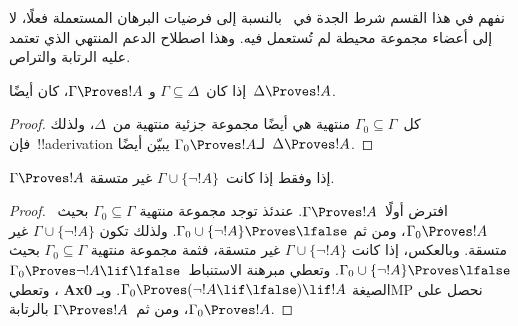 \documentclass[../../../include/open-logic-section]{subfiles}
\begin{document}
      {}
      {}


\begin{editorial}
نفهم في هذا القسم شرط الجدة في~\QR{} بالنسبة إلى فرضيات البرهان المستعملة
فعلًا، لا إلى أعضاء مجموعة محيطة لم تُستعمل فيه. وهذا اصطلاح الدعم المنتهي
الذي تعتمد عليه الرتابة والتراص.
\end{editorial}

\begin{prop}[الرتابة] إذا كان~$\Gamma \subseteq \Delta$ و
$\Gamma \Proves !A$، كان أيضًا~$\Delta \Proves !A$.
\end{prop}

\begin{proof}
كل~$\Gamma_0 \subseteq \Gamma$ منتهية هي أيضًا مجموعة جزئية منتهية
من~$\Delta$، ولذلك فإن~!!a{derivation} لـ$\Gamma_0 \Proves !A$ يبيّن
أيضًا~$\Delta \Proves !A$.
\end{proof}

\begin{prop}
$\Gamma \Proves !A$ إذا وفقط إذا كانت~$\Gamma\cup \{\lnot!A \}$ غير
متسقة.
\end{prop}

\begin{proof}
افترض أولًا~$\Gamma \Proves !A$. عندئذ توجد مجموعة منتهية
$\Gamma_0 \subseteq \Gamma$ بحيث~$\Gamma_0 \Proves !A$، ومن ثم
$\Gamma_0 \cup \{\lnot !A\} \Proves \lfalse$. ولذلك تكون
$\Gamma \cup \{\lnot !A\}$ غير متسقة. وبالعكس، إذا كانت
$\Gamma \cup \{\lnot !A\}$ غير متسقة، فثمة مجموعة منتهية
$\Gamma_0 \subseteq \Gamma$ بحيث
$\Gamma_0 \cup \{\lnot !A\} \Proves \lfalse$. وتعطي مبرهنة
الاستنباط~$\Gamma_0 \Proves \lnot !A \lif \lfalse$، وتعطي
\textbf{Ax0} الصيغة
$\Gamma_0 \Proves (\lnot !A \lif \lfalse) \lif !A$. وبـMP نحصل على
$\Gamma_0 \Proves !A$، ومن ثم~$\Gamma \Proves !A$ بالرتابة.
\end{proof}
\end{document}

